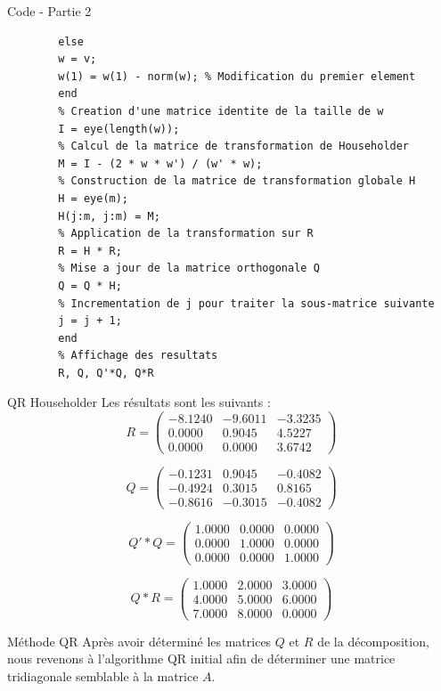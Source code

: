 \documentclass[french, 10pt]{beamer}
\theoremstyle{definition}
\begin{document}
\begin{frame}[fragile]{Code - Partie 2}
	\begin{lstlisting}
		else
		w = v;
		w(1) = w(1) - norm(w); % Modification du premier element
		end
		% Creation d'une matrice identite de la taille de w
		I = eye(length(w));
		% Calcul de la matrice de transformation de Householder
		M = I - (2 * w * w') / (w' * w);
		% Construction de la matrice de transformation globale H
		H = eye(m);
		H(j:m, j:m) = M;
		% Application de la transformation sur R
		R = H * R;
		% Mise a jour de la matrice orthogonale Q
		Q = Q * H;
		% Incrementation de j pour traiter la sous-matrice suivante
		j = j + 1;
		end
		% Affichage des resultats
		R, Q, Q'*Q, Q*R
	\end{lstlisting}
\end{frame}

\begin{frame}{QR Householder}
	Les résultats sont les suivants :
	\[
	R = \begin{pmatrix}
		-8.1240 & -9.6011 & -3.3235 \\
		0.0000  & 0.9045  & 4.5227 \\
		0.0000  & 0.0000  & 3.6742
	\end{pmatrix}
	\]
	
	\[
	Q = \begin{pmatrix}
		-0.1231 & 0.9045 & -0.4082 \\
		-0.4924 & 0.3015 & 0.8165 \\
		-0.8616 & -0.3015 & -0.4082
	\end{pmatrix}
	\]
	
	\[
	Q'*Q = \begin{pmatrix}
		1.0000 & 0.0000 & 0.0000 \\
		0.0000 & 1.0000 & 0.0000 \\
		0.0000 & 0.0000 & 1.0000
	\end{pmatrix}
	\]
	
	\[
	Q*R = \begin{pmatrix}
		1.0000 & 2.0000 & 3.0000 \\
		4.0000 & 5.0000 & 6.0000 \\
		7.0000 & 8.0000 & 0.0000
	\end{pmatrix}
	\]
	
\end{frame}
\begin{frame}{Méthode QR}
	Après avoir déterminé les matrices \( Q \) et \( R \) de la décomposition, nous revenons à l'algorithme QR initial afin de déterminer une matrice tridiagonale semblable à la matrice \( A \).
\end{frame}
\end{document}
